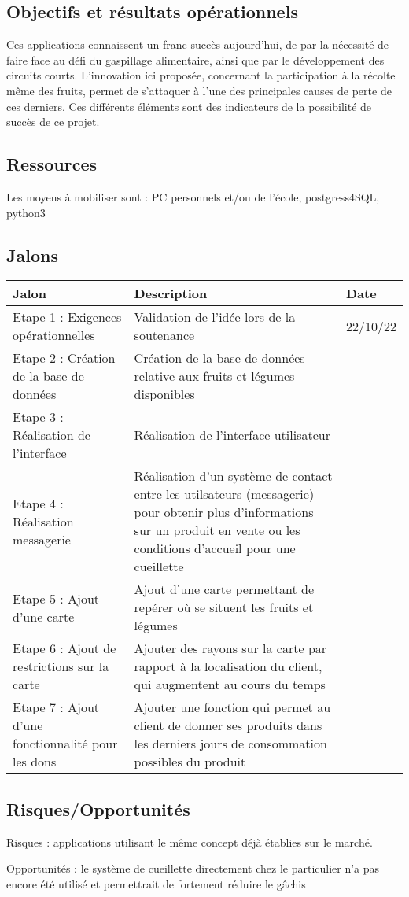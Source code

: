 \documentclass{article}
\begin{document}
\maketitle
\subsection{Objectifs et résultats opérationnels}

Ces applications connaissent un franc succès aujourd'hui, de par la nécessité de faire face au défi du gaspillage alimentaire, ainsi que par le développement des circuits courts. L'innovation ici proposée, concernant la participation à la récolte même des fruits, permet de s'attaquer à l'une des principales causes de perte de ces derniers. Ces différents éléments sont des indicateurs de la possibilité de succès de ce projet.

\subsection{Ressources}
Les moyens à mobiliser sont :
PC personnels et/ou de l'école, postgress4SQL, python3 


\subsection{Jalons}
\begin{center}
\begin{tabular}{|p{3cm}|p{5cm}|p{2cm}|} 
  \hline
  Jalon & Description & Date \\
  \hline
  Etape 1 : Exigences opérationnelles & Validation de l'idée lors de la soutenance & 22/10/22 \\
  \hline
  Etape 2 : Création de la base de données & Création de la base de données relative aux fruits et légumes disponibles &  \\
  \hline
  Etape 3 : Réalisation de l'interface & Réalisation de l'interface utilisateur & \\
  \hline
  Etape 4 : Réalisation messagerie & 
  Réalisation d'un système de contact entre les utilsateurs (messagerie) pour obtenir plus d'informations sur un produit en vente ou les conditions d'accueil pour une cueillette & \\
  \hline
  Etape 5 : Ajout d'une carte & Ajout d'une carte permettant de repérer où se situent les fruits et légumes & \\
  \hline
  Etape 6 : Ajout de restrictions sur la carte & Ajouter des rayons sur la carte par rapport à la localisation du client, qui augmentent au cours du temps & \\
  \hline
  Etape 7 : Ajout d'une fonctionnalité pour les dons & Ajouter une fonction qui permet au client de donner ses produits dans les derniers jours de consommation possibles du produit & \\ 
  \hline
\end{tabular}
\end{center}


\subsection{Risques/Opportunités}

Risques : applications utilisant le même concept déjà établies sur le marché.


Opportunités : le système de cueillette directement chez le particulier n'a pas encore été utilisé et permettrait de fortement réduire le gâchis
\end{document}
